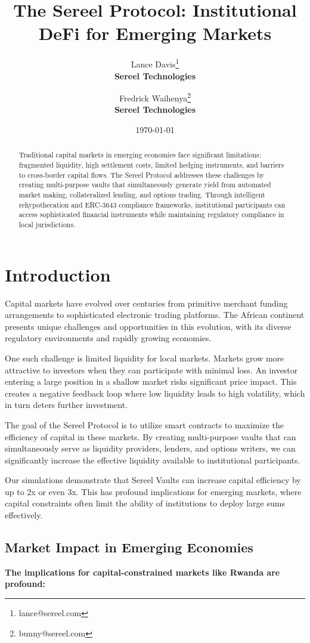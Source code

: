 \documentclass[12pt]{article}
\title{The Sereel Protocol: Institutional DeFi for Emerging Markets}
\author{
Lance Davis\thanks{lance@sereel.com} \\ 
\textbf{\small Sereel Technologies}
\and
Fredrick Waihenya\thanks{bunny@sereel.com} \\
\textbf{\small Sereel Technologies}
}
\date{\today}
\begin{document}
\maketitle

\begin{abstract}
Traditional capital markets in emerging economies face significant limitations: fragmented liquidity, high settlement costs, limited hedging instruments, and barriers to cross-border capital flows. The Sereel Protocol addresses these challenges by creating multi-purpose vaults that simultaneously generate yield from automated market making, collateralized lending, and options trading. Through intelligent rehypothecation and ERC-3643 compliance frameworks, institutional participants can access sophisticated financial instruments while maintaining regulatory compliance in local jurisdictions.
\end{abstract}

\section{Introduction}

Capital markets have evolved over centuries from primitive merchant funding arrangements to sophisticated electronic trading platforms. The African continent presents unique challenges and opportunities in this evolution, with its diverse regulatory environments and rapidly growing economies.

One such challenge is limited liquidity for local markets. Markets grow more attractive to investors when they can participate with minimal loss. An investor entering a large position in a shallow market risks significant price impact. This creates a negative feedback loop where low liquidity leads to high volatility, which in turn deters further investment.

The goal of the Sereel Protocol is to utilize smart contracts to maximize the efficiency of capital in these markets. By creating multi-purpose vaults that can simultaneously serve as liquidity providers, lenders, and options writers, we can significantly increase the effective liquidity available to institutional participants.

Our simulations demonstrate that Sereel Vaults can increase capital efficiency by up to 2x or even 3x. This has profound implications for emerging markets, where capital constraints often limit the ability of institutions to deploy large sums effectively.


\subsection{Market Impact in Emerging Economies}
\textbf{The implications for capital-constrained markets like Rwanda are profound:}
\end{document}
